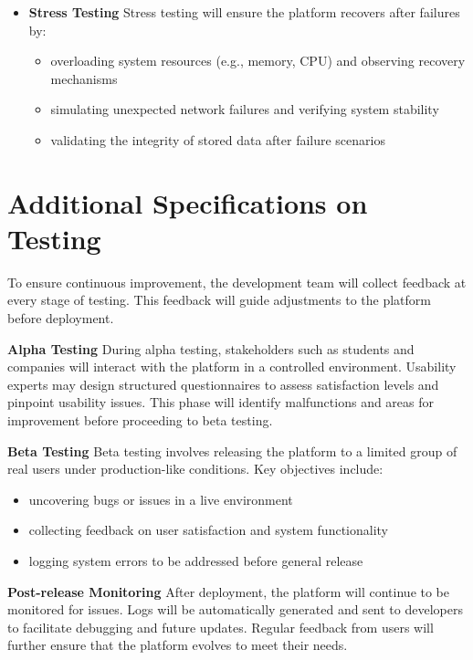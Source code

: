 \begin{itemize}
\item \textbf{Stress Testing}
Stress testing will ensure the platform recovers after failures by:
\begin{itemize}
    \item overloading system resources (e.g., memory, CPU) and observing recovery mechanisms
    \item simulating unexpected network failures and verifying system stability
    \item validating the integrity of stored data after failure scenarios
\end{itemize}

\end{itemize}


\section{Additional Specifications on Testing}
To ensure continuous improvement, the development team will collect feedback at every stage of testing. This feedback will guide adjustments to the platform before deployment.

\textbf{Alpha Testing}
During alpha testing, stakeholders such as students and companies will interact with the platform in a controlled environment. Usability experts may design structured questionnaires to assess satisfaction levels and pinpoint usability issues. This phase will identify malfunctions and areas for improvement before proceeding to beta testing.

\textbf{Beta Testing}
Beta testing involves releasing the platform to a limited group of real users under production-like conditions. Key objectives include:
\begin{itemize}
    \item uncovering bugs or issues in a live environment
    \item collecting feedback on user satisfaction and system functionality
    \item logging system errors to be addressed before general release
\end{itemize}

\textbf{Post-release Monitoring}
After deployment, the platform will continue to be monitored for issues. Logs will be automatically generated and sent to developers to facilitate debugging and future updates. Regular feedback from users will further ensure that the platform evolves to meet their needs.

\newpage

